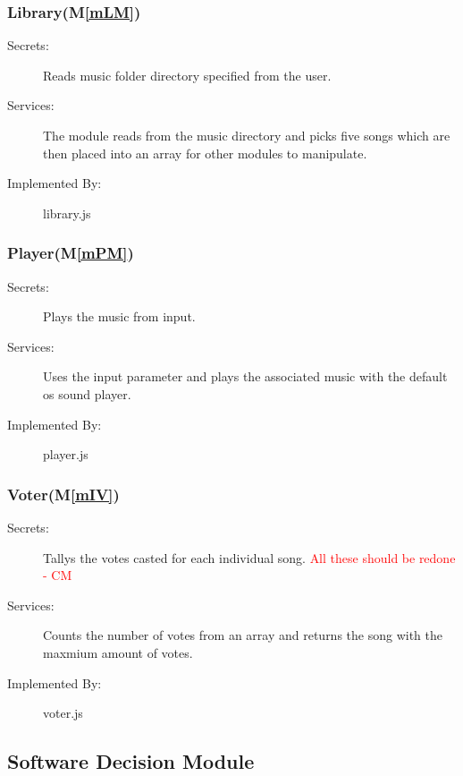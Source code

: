 \documentclass[12pt, titlepage]{article}
\newcommand{\mref}[1]{M\ref{#1}}
\begin{document}
\subsubsection{Library(\mref{mLM})} 
\begin{description} 
\item[Secrets:] Reads music folder directory specified from the user. \item[Services:]The module reads from the music directory and picks five songs which are then placed into an array for other modules to manipulate. \item[Implemented By:] library.js 
\end{description} 

\subsubsection{Player(\mref{mPM})}


\begin{description}
\item[Secrets:] Plays the music from input.
\item[Services:]Uses the input parameter and plays the associated music with the default os sound player.
\item[Implemented By:]player.js
\end{description}



\subsubsection{Voter(\mref{mIV})}


\begin{description}
\item[Secrets:]Tallys the votes casted for each individual song. \textcolor{red}{All these should be redone - CM} \\
\item[Services:]Counts the number of votes from an array and returns the song with the maxmium amount of votes.
\item[Implemented By:] voter.js
\end{description}










\subsection{Software Decision Module}
\end{document}

